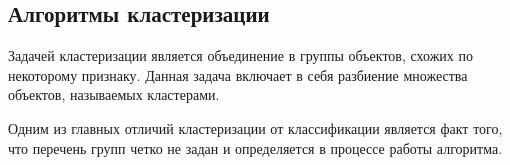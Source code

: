 %
%
%
%
%
%
%

\subsection{Алгоритмы кластеризации}
Задачей кластеризации является объединение в группы объектов, схожих по некоторому признаку. Данная задача включает в себя разбиение множества объектов, называемых кластерами. \cite{clasters}

Одним из главных отличий кластеризации от классификации является \newline факт того, что перечень групп четко не задан и определяется в процессе работы алгоритма. \cite{clasters}

